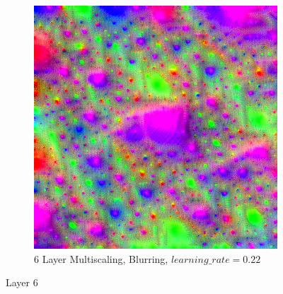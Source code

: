 \begin{figure}
\begin{subfigure}[t]{0.31\textwidth}
    \end{subfigure}
    \hfill
    \begin{subfigure}[t]{0.31\textwidth}
        \captionsetup{justification=centering}
        \centering
        \includegraphics[width=.7\linewidth]{figuras/feat_vis/experiments/intermediary/l6/random_image_pl6_lr2.2e-1_layer12.png}
        \caption{6 Layer Multiscaling, Blurring, \(learning\_rate = 0.22\)}
    \end{subfigure}
    
    \caption{Layer 6}
    \label{fig:layer_6}
\end{figure}
